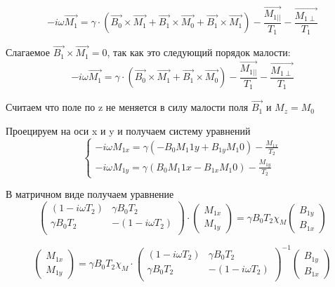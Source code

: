 \documentclass[12pt]{article}
\begin{document}
\begin{large}
\[
   -i\omega \overrightarrow{M_1} = \gamma \cdot \left( \overrightarrow{B_0} \times \overrightarrow{M_1} +  \overrightarrow{B_1} \times \overrightarrow{M_0} + \overrightarrow{B_1} \times \overrightarrow{M_1} \right) - \frac{\overrightarrow{M_{1 ||}}}{T_1} - \frac{\overrightarrow{M_{1 \perp}}}{T_1}
\]
\par Слагаемое $\overrightarrow{B_1} \times \overrightarrow{M_1} = 0$, так как это следующий порядок малости:
\[
   -i\omega \overrightarrow{M_1} = \gamma \cdot \left( \overrightarrow{B_0} \times \overrightarrow{M_1} +  \overrightarrow{B_1} \times \overrightarrow{M_0} \right) - \frac{\overrightarrow{M_{1 ||}}}{T_1} - \frac{\overrightarrow{M_{1 \perp}}}{T_1}
\]
\par Считаем что поле по z не меняется в силу малости поля $\overrightarrow{B_1}$ и $M_z = M_0$
\par Проецируем на оси x и y и получаем систему уравнений
\begin{equation*}
    \begin{cases}
        -i\omega M_{1x} = \gamma \left( -B_{0} M_1{1y} + B_{1y} M_1{0} \right) -\frac{M_{1x}}{T_2} \\
        -i\omega M_{1y} = \gamma \left( B_{0} M_1{1x} - B_{1x} M_1{0} \right) -\frac{M_{1y}}{T_2}
    \end{cases}
\end{equation*}
\par В матричном виде получаем уравнение
\begin{equation*}
    \begin{pmatrix}
        \left( 1 -i\omega T_2 \right) & \gamma B_0 T_2 \\
         \gamma B_0 T_2 & - \left( 1 -i\omega T_2 \right) \\
    \end{pmatrix}
    \cdot
    \begin{pmatrix}
        M_{1x} \\
        M_{1y}
    \end{pmatrix}
    = \gamma B_0 T_2 \chi_M
    \begin{pmatrix}
        B_{1y} \\
        B_{1x}
    \end{pmatrix}
\end{equation*}

\begin{equation*}
    \begin{pmatrix}
        M_{1x} \\
        M_{1y}
    \end{pmatrix}
    = \gamma B_0 T_2 \chi_M \cdot
    \begin{pmatrix}
        \left( 1 -i\omega T_2 \right) & \gamma B_0 T_2 \\
         \gamma B_0 T_2 & - \left( 1 -i\omega T_2 \right) \\
    \end{pmatrix}^{-1}
    \begin{pmatrix}
        B_{1y} \\
        B_{1x}
    \end{pmatrix}
\end{equation*}


\end{large}
\end{document}
